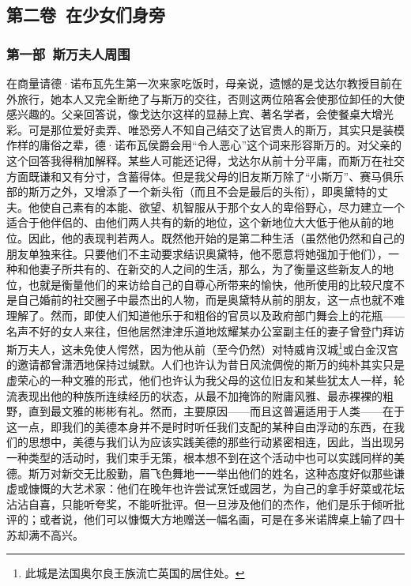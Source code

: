 \subsection{第二卷\ 在少女们身旁}


\subsubsection*{第一部\ 斯万夫人周围}

\par 在商量请德·诺布瓦先生第一次来家吃饭时，母亲说，遗憾的是戈达尔教授目前在外旅行，她本人又完全断绝了与斯万的交往，否则这两位陪客会使那位卸任的大使感兴趣的。父亲回答说，像戈达尔这样的显赫上宾、著名学者，会使餐桌大增光彩。可是那位爱好卖弄、唯恐旁人不知自己结交了达官贵人的斯万，其实只是装模作样的庸俗之辈，德·诺布瓦侯爵会用“令人恶心”这个词来形容斯万的。对父亲的这个回答我得稍加解释。某些人可能还记得，戈达尔从前十分平庸，而斯万在社交方面既谦和又有分寸，含蓄得体。但是我父母的旧友斯万除了“小斯万”、赛马俱乐部的斯万之外，又增添了一个新头衔（而且不会是最后的头衔），即奥黛特的丈夫。他使自己素有的本能、欲望、机智服从于那个女人的卑俗野心，尽力建立一个适合于他伴侣的、由他们两人共有的新的地位，这个新地位大大低于他从前的地位。因此，他的表现判若两人。既然他开始的是第二种生活（虽然他仍然和自己的朋友单独来往。只要他们不主动要求结识奥黛特，他不愿意将她强加于他们），一种和他妻子所共有的、在新交的人之间的生活，那么，为了衡量这些新友人的地位，也就是衡量他们的来访给自己的自尊心所带来的愉快，他所使用的比较尺度不是自己婚前的社交圈子中最杰出的人物，而是奥黛特从前的朋友，这一点也就不难理解了。然而，即使人们知道他乐于和粗俗的官员以及政府部门舞会上的花瓶——名声不好的女人来往，但他居然津津乐道地炫耀某办公室副主任的妻子曾登门拜访斯万夫人，这未免使人愕然，因为他从前（至今仍然）对特威肯汉城\footnote{此城是法国奥尔良王族流亡英国的居住处。}或白金汉宫的邀请都曾潇洒地保持过缄默。人们也许认为昔日风流倜傥的斯万的纯朴其实只是虚荣心的一种文雅的形式，他们也许认为我父母的这位旧友和某些犹太人一样，轮流表现出他的种族所连续经历的状态，从最不加掩饰的附庸风雅、最赤裸裸的粗野，直到最文雅的彬彬有礼。然而，主要原因——而且这普遍适用于人类——在于这一点，即我们的美德本身并不是时时听任我们支配的某种自由浮动的东西，在我们的思想中，美德与我们认为应该实践美德的那些行动紧密相连，因此，当出现另一种类型的活动时，我们束手无策，根本想不到在这个活动中也可以实践同样的美德。斯万对新交无比殷勤，眉飞色舞地一一举出他们的姓名，这种态度好似那些谦虚或慷慨的大艺术家：他们在晚年也许尝试烹饪或园艺，为自己的拿手好菜或花坛沾沾自喜，只能听夸奖，不能听批评。但一旦涉及他们的杰作，他们是乐于倾听批评的；或者说，他们可以慷慨大方地赠送一幅名画，可是在多米诺牌桌上输了四十苏却满不高兴。
